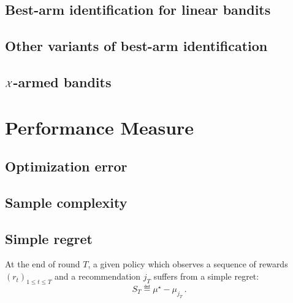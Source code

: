 \subsection{Best-arm identification for linear bandits}

\subsection{Other variants of best-arm identification}

\subsection{$\mathcal{X}$-armed bandits}

\section{Performance Measure}\label{sec:mab.performance}

\subsection{Optimization error}

\subsection{Sample complexity}

\subsection{Simple regret}

\begin{definition}\label{def:stoch_mab.simple_regret}
\begin{leftbar}[defnbar]
	At the end of round $T$, a given policy which observes a sequence of rewards $(r_t)_{1 \leq t \leq T}$ and a recommendation $j_T$ suffers from a simple regret:
	\[
		S_T \eqdef \mu^{\star} - \mu_{j_T}\,.
	\]
\end{leftbar}
\end{definition}